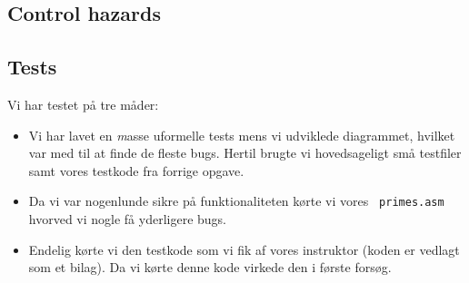 \subsection{Control hazards}

\subsection{Tests}
Vi har testet på tre måder:
\begin{itemize}
\item Vi har lavet en {\emph masse} uformelle tests mens vi udviklede
diagrammet, hvilket var med til at finde de fleste bugs. Hertil brugte vi
hovedsageligt små testfiler samt vores testkode fra forrige opgave.
\item Da vi var nogenlunde sikre på funktionaliteten kørte vi vores {\tt
primes.asm} hvorved vi nogle få yderligere bugs.
\item Endelig kørte vi den testkode som vi fik af vores instruktor (koden er
vedlagt som et bilag). Da vi kørte denne kode virkede den i første forsøg.
\end{itemize}

